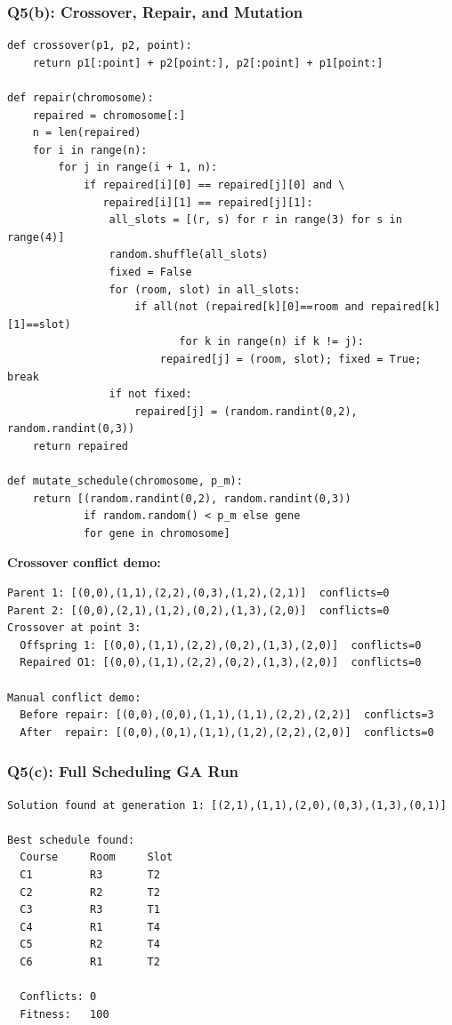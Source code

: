 \documentclass[12pt,a4paper]{article}
\begin{document}
\subsubsection*{Q5(b): Crossover, Repair, and Mutation}

\begin{lstlisting}[style=pycode, caption={Q5(b): Crossover, repair, mutate}]
def crossover(p1, p2, point):
    return p1[:point] + p2[point:], p2[:point] + p1[point:]

def repair(chromosome):
    repaired = chromosome[:]
    n = len(repaired)
    for i in range(n):
        for j in range(i + 1, n):
            if repaired[i][0] == repaired[j][0] and \
               repaired[i][1] == repaired[j][1]:
                all_slots = [(r, s) for r in range(3) for s in range(4)]
                random.shuffle(all_slots)
                fixed = False
                for (room, slot) in all_slots:
                    if all(not (repaired[k][0]==room and repaired[k][1]==slot)
                           for k in range(n) if k != j):
                        repaired[j] = (room, slot); fixed = True; break
                if not fixed:
                    repaired[j] = (random.randint(0,2), random.randint(0,3))
    return repaired

def mutate_schedule(chromosome, p_m):
    return [(random.randint(0,2), random.randint(0,3))
            if random.random() < p_m else gene
            for gene in chromosome]
\end{lstlisting}

\textbf{Crossover conflict demo:}

\begin{lstlisting}[style=output]
Parent 1: [(0,0),(1,1),(2,2),(0,3),(1,2),(2,1)]  conflicts=0
Parent 2: [(0,0),(2,1),(1,2),(0,2),(1,3),(2,0)]  conflicts=0
Crossover at point 3:
  Offspring 1: [(0,0),(1,1),(2,2),(0,2),(1,3),(2,0)]  conflicts=0
  Repaired O1: [(0,0),(1,1),(2,2),(0,2),(1,3),(2,0)]  conflicts=0

Manual conflict demo:
  Before repair: [(0,0),(0,0),(1,1),(1,1),(2,2),(2,2)]  conflicts=3
  After  repair: [(0,0),(0,1),(1,1),(1,2),(2,2),(2,0)]  conflicts=0
\end{lstlisting}

\subsubsection*{Q5(c): Full Scheduling GA Run}

\begin{lstlisting}[style=output]
Solution found at generation 1: [(2,1),(1,1),(2,0),(0,3),(1,3),(0,1)]

Best schedule found:
  Course     Room     Slot
  C1         R3       T2
  C2         R2       T2
  C3         R3       T1
  C4         R1       T4
  C5         R2       T4
  C6         R1       T2

  Conflicts: 0
  Fitness:   100
\end{lstlisting}
\end{document}
